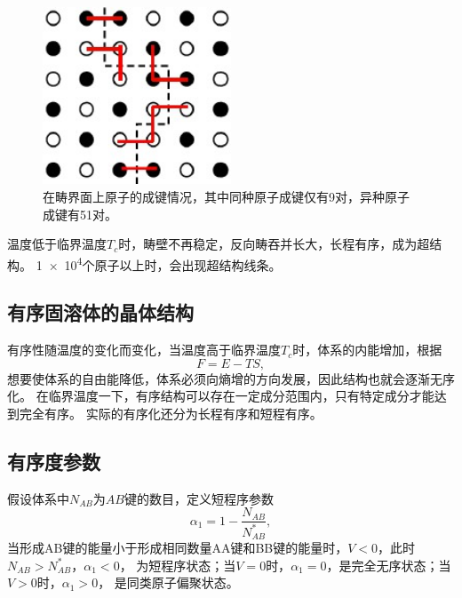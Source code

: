         \begin{figure}[ht]
            \centering
            \includegraphics[width=0.5\textwidth]{fig/bands_near_domian_boundry.jpg}
            \caption{在畴界面上原子的成键情况，其中同种原子成键仅有9对，异种原子成键有51对。}
            \label{畴界面上原子}
        \end{figure}

        温度低于临界温度$T_c$时，畴壁不再稳定，反向畴吞并长大，长程有序，成为超结构。
        \num{1e4}个原子以上时，会出现超结构线条。


        \subsection{有序固溶体的晶体结构}
            有序性随温度的变化而变化，当温度高于临界温度$T_c$时，体系的内能增加，根据
            \begin{equation}
                F=E-TS,
            \end{equation}
            想要使体系的自由能降低，体系必须向熵增的方向发展，因此结构也就会逐渐无序化。    
            在临界温度一下，有序结构可以存在一定成分范围内，只有特定成分才能达到完全有序。
            实际的有序化还分为长程有序和短程有序。
        \subsection{有序度参数}
            假设体系中$N_{AB}$为$AB$键的数目，定义短程序参数
            \begin{equation}
                \alpha_1=1-\frac{N_{AB}}{N_{AB}^*},
            \end{equation}
            当形成AB键的能量小于形成相同数量AA键和BB键的能量时，$V<0$，此时$N_{AB}>N^*_{AB}$，$\alpha_1<0$，
            为短程序状态；当$V=0$时，$\alpha_1=0$，是完全无序状态；当$V>0$时，$\alpha_1>0$，
            是同类原子偏聚状态。

